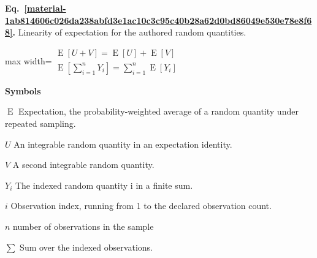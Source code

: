 \documentclass[11pt,a4paper]{article}
\begin{document}
\par\medskip
\begin{samepage}
\label{material-1ab814606c026da238abfd3e1ac10c3c95c40b28a62d0bd86049e530e78e8f68}
\noindent\textbf{Eq.~\ref*{material-1ab814606c026da238abfd3e1ac10c3c95c40b28a62d0bd86049e530e78e8f68}.} Linearity of expectation for the authored random quantities.\par\nopagebreak
\begin{center}\begin{adjustbox}{max width=\linewidth}$\displaystyle \begin{gathered}\operatorname{E}[U+V]=\operatorname{E}[U]+\operatorname{E}[V]\\\operatorname{E}[{\textstyle\sum_{i=1}^n}Y_i]={\textstyle\sum_{i=1}^n}\operatorname{E}[Y_i]\end{gathered}$\end{adjustbox}\end{center}

\par\noindent\textbf{Symbols}

\par\noindent\textbf{\(\operatorname{E}\)} Expectation, the probability-weighted average of a random quantity under repeated sampling.

\par\noindent\textbf{\(U\)} An integrable random quantity in an expectation identity.

\par\noindent\textbf{\(V\)} A second integrable random quantity.

\par\noindent\textbf{\(Y_i\)} The indexed random quantity i in a finite sum.

\par\noindent\textbf{\(i\)} Observation index, running from 1 to the declared observation count.

\par\noindent\textbf{\(n\)} number of observations in the sample

\par\noindent\textbf{\(\sum\)} Sum over the indexed observations.

\end{samepage}
\medskip
\end{document}
